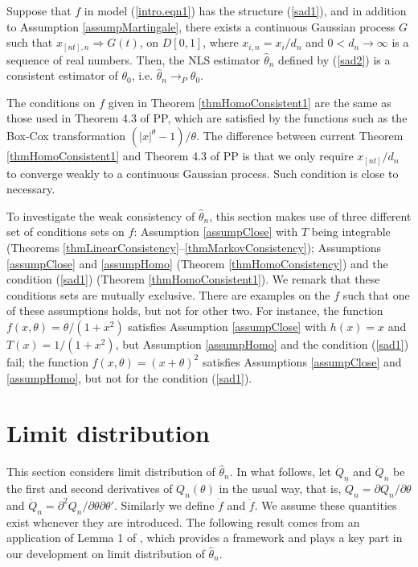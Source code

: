 \begin{thm}  Suppose that $f$ in model (\ref {intro.eqn1}) has the structure (\ref {sad1}), and in addition to Assumption \ref{assumpMartingale}, there exists a continuous Gaussian process $G$ such that $x_{[nt], n} \Rightarrow G(t)$, on $D[0,1]$, where $x_{i,n} = x_i / d_n$  and $0 < d_n \to \infty$ is a sequence of real numbers. Then,
 the NLS estimator $\hat{\theta}_n$ defined by (\ref {sad2}) is a consistent estimator of $\theta_0$, i.e. $\hat{\theta}_n \rightarrow_P \theta_0$.
\end{thm}





 The conditions on $f$ given in Theorem \ref {thmHomoConsistent1} are the same as those used in Theorem 4.3 of PP, which are satisfied by the functions such as  the Box-Cox transformation $(|x|^\theta - 1)/\theta$. The difference between current Theorem \ref{thmHomoConsistent1} and Theorem 4.3 of PP is that we only require $x_{[nt]} / d_n$ to converge weakly to a continuous Gaussian  process. Such condition is close to necessary.


To investigate the weak consistency of $\hat\theta_n$, this section makes use of three different set of conditions sets on $f$: Assumption \ref{assumpClose} with $T$ being integrable (Theorems \ref{thmLinearConsistency}--\ref{thmMarkovConsistency}); Assumptions \ref{assumpClose} and \ref{assumpHomo} (Theorem \ref{thmHomoConsistency}) and the condition (\ref {sad1}) (Theorem \ref{thmHomoConsistent1}). We remark that these conditions sets are mutually exclusive. There are examples on the $f$ such that one of these assumptions holds, but not for other two. For instance, the function $f(x, \theta)=\theta/(1+x^2)$ satisfies Assumption \ref{assumpClose}  with $h(x)=x$ and $T(x)=1/(1+x^2)$, but Assumption \ref{assumpHomo} and  the condition (\ref {sad1}) fail; the function $f(x, \theta)=(x+\theta)^2$ satisfies Assumptions \ref{assumpClose} and \ref{assumpHomo}, but not for the condition (\ref {sad1}).


\section{Limit distribution} 
This section considers  limit distribution of $\hat{\theta}_n$. In what follows,  let $\dot{Q}_n$ and $\ddot{Q}_n$ be the first and second derivatives of $Q_n(\theta)$ in the usual way, that is, $\dot{Q}_n=\partial Q_n / \partial \theta$ and $\ddot{Q}_n=\partial^2 Q_n / \partial \theta \partial \theta'$. Similarly we define $\dot{f}$  and $\ddot{f}$. We assume these quantities exist whenever they are introduced. The following result  comes from an application of Lemma 1 of \cite{andrewssun2004}, which provides a framework and plays a key part in our development on limit distribution of $\hat{\theta}_n$.

